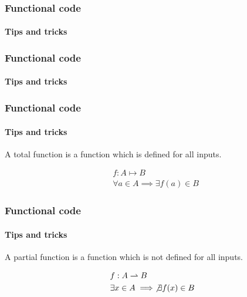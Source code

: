 \begin{frame}
    \frametitle{Functional code}
    \framesubtitle{Tips and tricks}


\pause

\end{frame}

\begin{frame}
    \frametitle{Functional code}
    \framesubtitle{Tips and tricks}


\pause

\end{frame}

\begin{frame}
    \frametitle{Functional code}
    \framesubtitle{Tips and tricks}

    A total function is a function which is defined for all inputs.

    \pause

    \begin{definition}
        \begin{align*}
        & f: A \mapsto B\\
        & \forall a \in A \implies \exists f(a) \in B
        \end{align*}
    \end{definition}
\end{frame}

\begin{frame}
    \frametitle{Functional code}
    \framesubtitle{Tips and tricks}

    A partial function is a function which is not defined for all inputs.

    \pause

    \begin{definition}
        \begin{align*}
        & f: A \rightharpoonup B\\
        & \exists x \in A \implies \not\exists f(x) \in B
        \end{align*}
    \end{definition}
\end{frame}

